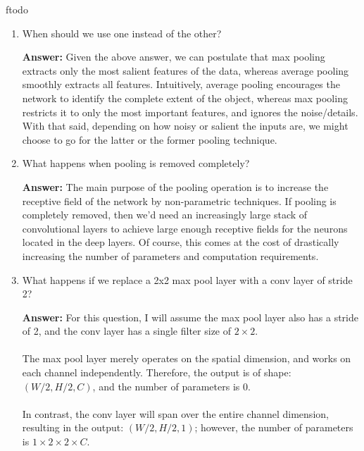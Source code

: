ƒtodo\documentclass{article}
\newenvironment{QandA}{\begin{enumerate}[label=\arabic*.]}{\end{enumerate}}
\newenvironment{InnerQandA}{\begin{enumerate}[label=\roman*.]}{\end{enumerate}}
\newenvironment{answer}{\par\normalfont \textbf{Answer:}}{}
\begin{document}
\begin{QandA}
\begin{InnerQandA}
        \item When should we use one instead of the other?
        \begin{answer}
            Given the above answer, we can postulate that max pooling extracts only the most salient features of the data, whereas average pooling smoothly extracts all features. Intuitively, average pooling encourages the network to identify the complete extent of the object, whereas max pooling restricts it to only the most important features, and ignores the noise/details. With that said, depending on how noisy or salient the inputs are, we might choose to go for the latter or the former pooling technique.
        \end{answer}

        \item What happens when pooling is removed completely?
        \begin{answer}
            The main purpose of the pooling operation is to increase the receptive field of the network by non-parametric techniques. If pooling is completely removed, then we'd need an increasingly large stack of convolutional layers to achieve large enough receptive fields for the neurons located in the deep layers. Of course, this comes at the cost of drastically increasing the number of parameters and computation requirements.
        \end{answer}

        \item What happens if we replace a 2x2 max pool layer with a conv layer of stride 2?
        \begin{answer}
            For this question, I will assume the max pool layer also has a stride of 2, and the conv layer has a single filter size of $2 \times 2$. \\\\
            The max pool layer merely operates on the spatial dimension, and works on each channel independently. Therefore, the output is of shape: $(W/2, H/2, C)$, and the number of parameters is $0$. \\\\
            In contrast, the conv layer will span over the entire channel dimension, resulting in the output: $(W/2, H/2, 1)$; however, the number of parameters is $1 \times 2 \times 2 \times C$. 
        \end{answer}
    \end{InnerQandA}


\end{QandA}
\end{document}
